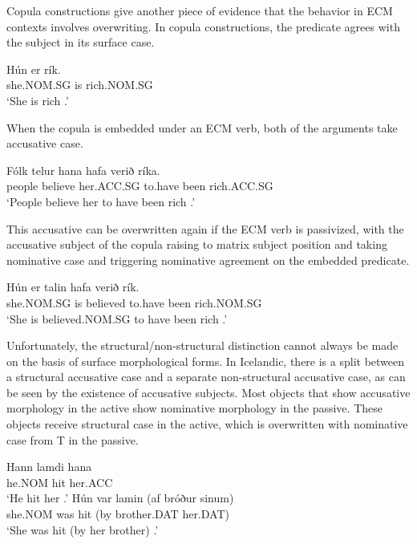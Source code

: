 Copula constructions give another piece of evidence that the behavior in ECM contexts involves overwriting. In copula constructions, the predicate agrees with the subject in its surface case. 

\begin{exe}
\ex \gll Hún er rík.\\
she.NOM.SG is rich.NOM.SG\\
\trans `She is rich \citep[ex 8.110a]{Thrainsson.2007}.'
\end{exe}

When the copula is embedded under an ECM verb, both of the arguments take accusative case.

\begin{exe}
\ex \gll Fólk telur hana hafa verið ríka.\\
people believe her.ACC.SG to.have been rich.ACC.SG\\
\trans `People believe her to have been rich \citep[ex 8.110b]{Thrainsson.2007}.'
\end{exe}

This accusative can be overwritten again if the ECM verb is passivized, with the accusative subject of the copula raising to matrix subject position and taking nominative case and triggering nominative agreement on the embedded predicate.

\begin{exe}
\ex \gll Hún er talin hafa verið rík.\\
she.NOM.SG is believed to.have been rich.NOM.SG\\
\trans `She is believed.NOM.SG to have been rich \citep[ex 8.110b]{Thrainsson.2007}.'
\end{exe}

Unfortunately, the structural/non-structural distinction cannot always be made on the basis of surface morphological forms. In Icelandic, there is a split between a structural accusative case and a separate non-structural accusative case, as can be seen by the existence of accusative subjects. Most objects that show accusative morphology in the active show nominative morphology in the passive. These objects receive structural case in the active, which is overwritten with nominative case from T in the passive.

\begin{exe}
\ex
\begin{xlist}
\ex \gll Hann lamdi hana\\
he.NOM hit her.ACC\\
\trans `He hit her \citep[Fig. 11a]{Yip.1987}.'
\ex \gll Hún var lamin (af bróður sinum)\\
she.NOM was hit (by brother.DAT her.DAT)\\
\trans `She was hit (by her brother) \citep[Fig. 11a]{Yip.1987}.'
\end{xlist}
\end{exe}


